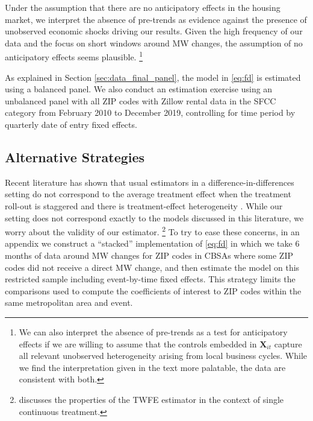 Under the assumption that there are no anticipatory effects in the housing 
market, we interpret the absence of pre-trends as evidence against the presence 
of unobserved economic shocks driving our results.
Given the high frequency of our data and the focus on short windows around 
MW changes, the assumption of no anticipatory effects seems plausible.%
\footnote{We can also interpret the absence of pre-trends as a test for 
anticipatory effects if we are willing to assume that the controls embedded in 
$\mathbf{X}_{it}$ capture all relevant unobserved heterogeneity arising from 
local business cycles.
While we find the interpretation given in the text more palatable, the data are 
consistent with both.}


As explained in Section \ref{sec:data_final_panel}, 
the model in \eqref{eq:fd} is estimated using a balanced panel.
We also conduct an estimation exercise using an unbalanced panel with all 
ZIP codes with Zillow rental data in the SFCC category 
from February 2010 to December 2019, controlling for time period by 
quarterly date of entry fixed effects.

\subsection{Alternative Strategies}\label{sec:alt_emp_strategies}

Recent literature has shown that usual estimators in a difference-in-differences 
setting do not correspond to the average treatment effect when the treatment 
roll-out is staggered and there is treatment-effect heterogeneity 
\parencite{deChaisemartinEtAl2022,RothEtAl2022}.
While our setting does not correspond exactly to the models discussed in this
literature, we worry about the validity of our estimator.%
\footnote{\textcite[][Section 3.4]{CallawayEtAl2021} discusses the properties 
of the TWFE estimator in the context of single continuous treatment.}
To try to ease these concerns, in an appendix we construct a ``stacked'' 
implementation of \eqref{eq:fd} in which we take 6 months of data around MW 
changes for ZIP codes in CBSAs where some ZIP codes did not receive a direct 
MW change, 
and then estimate the model on this restricted sample including 
event-by-time fixed effects.
This strategy limits the comparisons used to compute the coefficients of 
interest to ZIP codes within the same metropolitan area and event.

